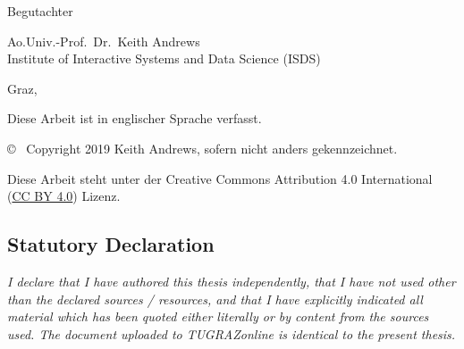 \begin{otherlanguage}{austrian}
\begin{center}
{\small\sffamily Begutachter}

\vspace{5mm}

{\normalsize\sffamily
Ao.Univ.-Prof.\ Dr.\ Keith Andrews \\
Institute of Interactive Systems and Data Science (ISDS)
}


\vspace{1cm}

{\normalsize\sffamily Graz, \thisdate}


\vspace{1cm}

{\small Diese Arbeit ist in englischer Sprache verfasst.}



\vfill

{\footnotesize\sffamily \copyright ~ Copyright 2019 Keith Andrews, sofern
nicht anders gekennzeichnet.}

{\footnotesize\sffamily Diese Arbeit steht unter der Creative Commons
Attribution 4.0 International
(\href{https://creativecommons.org/licenses/by/4.0/}{CC BY 4.0})
Lizenz.}

\end{center}

\end{otherlanguage}







\cleardoublepage

\vspace*{2cm}







\subsection*{Statutory Declaration}
\noindent
\textit{
I declare that I have authored this thesis independently, that I have
not used other than the declared sources / resources, and that I have
explicitly indicated all material which has been quoted either
literally or by content from the sources used. The document uploaded
to TUGRAZonline is identical to the present thesis.}

